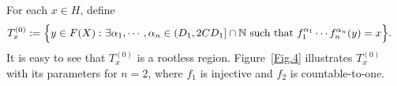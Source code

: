 \documentclass[11pt, reqno, a4paper]{amsart}
\theoremstyle{definition}
\theoremstyle{plain}
\begin{document}
\medskip
For each $x\in H$, define
$$
\begin{aligned}
T^{(0)}_{x}
:=\Bigl\{y\in F(X):\ &\exists \alpha_1,\cdots, \alpha_n\in(D_1,2CD_1]\cap\mathbb{N} \mbox{ such that } f_1^{\alpha_1}\cdots f_n^{\alpha_n}(y)=x\Bigr\}.
\end{aligned}
$$
It is easy to see that $T_x^{(0)}$ is a rootless region. Figure~\ref{Fig.4} illustrates $T_x^{(0)}$ with its parameters for $n=2$, where $f_1$ is injective and $f_2$ is
countable-to-one.
\begin{figure}[H]
    \centering



\begin{tikzpicture}[x=0.75pt,y=0.75pt,yscale=-1,xscale=1]


\end{tikzpicture}
\end{figure}
\end{document}

